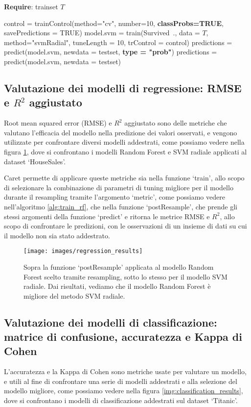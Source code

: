 \documentclass[12pt]{article}
\begin{document}
\begin{algorithm}[H]
    \caption{}\label{alg:predict}
    \textbf{Require}: trainset $T$
    \begin{algorithmic}[1]
    \State control = trainControl(method="cv", number=10, \textbf{classProbs=TRUE}, savePredictions = TRUE)
    \State model.svm = train(Survived~., data = $T$, method="svmRadial", tuneLength = 10, trControl = control)
    \State predictions = predict(model.svm, newdata = testset, \textbf{type = "prob"}) 
    \State predictions = predict(model.svm, newdata = testset) 
    \end{algorithmic}
\end{algorithm}

\subsection{Valutazione dei modelli di regressione: RMSE e $R^2$ aggiustato}
Root mean squared error (RMSE) e $R^2$ aggiustato sono delle metriche che valutano l'efficacia del modello nella predizione dei valori osservati, e vengono utilizzate per 
confrontare diversi modelli addestrati, come possiamo vedere nella figura \ref{img:regression_results}, dove si confrontano i modelli Random Forest e SVM radiale applicati al dataset ‘HouseSales’.

Caret permette di applicare queste metriche sia nella funzione ‘train’, allo scopo di selezionare la combinazione di parametri di tuning migliore per il modello durante il resampling tramite l'argomento ‘metric’, 
come possiamo vedere nell'algoritmo \ref{alg:train_rf}, che nella funzione ‘postResample’, che prende gli stessi argomenti della funzione ‘predict’ e ritorna le metrice RMSE e $R^2$,
 allo scopo di confrontare le predizioni, con le osservazioni di un insieme di dati su cui il modello non sia stato addestrato.

 \begin{figure}[H]
    \centering
    \texttt{[image: images/regression\_results]}
    \caption{Sopra la funzione ‘postResample’ applicata al modello Random Forest scelto tramite resampling, sotto lo stesso per il modello SVM radiale. 
    Dai risultati, vediamo che il modello Random Forest è migliore del metodo SVM radiale.} 
    \label{img:regression_results}
\end{figure}

\subsection{Valutazione dei modelli di classificazione: matrice di confusione, accuratezza e Kappa di Cohen}
L'accuratezza e la Kappa di Cohen sono metriche usate per valutare un modello, e utili al fine di confrontare una serie di modelli addestrati e alla selezione del modello migliore, come possiamo vedere nella figura \ref{img:classification_results}, dove si confrontano 
i modelli di classificazione addestrati sul dataset ‘Titanic’.
\end{document}
